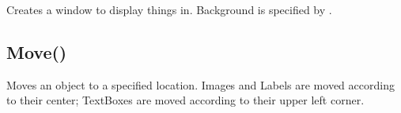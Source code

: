 \documentclass[letterpaper,10pt,english]{sphinxmanual}
\begin{document}
\sphinxAtStartPar
{}

\sphinxAtStartPar
Creates a window to display things in.          Background is specified by .

\sphinxAtStartPar
{}

\begin{sphinxVerbatim}[commandchars=\\\{\}]
\end{sphinxVerbatim}

\sphinxAtStartPar
{}

\begin{sphinxVerbatim}[commandchars=\\\{\}]

\end{sphinxVerbatim}

\ignorespaces 

\subsection{Move()}
\label{\detokenize{reference/peblobjects:move}}\label{\detokenize{reference/peblobjects:index-31}}
\sphinxAtStartPar
{}

\sphinxAtStartPar
Moves an object to a specified location.                Images and Labels are moved according to their center;                  TextBoxes are moved according to their upper left corner.

\sphinxAtStartPar
{}
\end{document}
